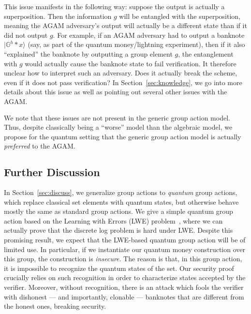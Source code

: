 \documentclass{article}\usepackage[a4paper,margin=20mm]{geometry}
\numberwithin{theorem}{section}
\numberwithin{equation}{section}
\newcommand{\G}{\mathbb{G}}
\begin{document}
This issue manifests in the following way: suppose the output is actually a superposition. Then the information $g$ will be entangled with the superposition, meaning the AGAM adversary's output will actually be a different state than if it did not output $g$. For example, if an AGAM adversary had to output a banknote $|\G^h*x\rangle$ (say, as part of the quantum money/lightning experiment), then if it also ``explained'' the banknote by outputting a group element $g$, the entanglement with $g$ would actually cause the banknote state to fail verification. It therefore unclear how to interpret such an adversary. Does it actually break the scheme, even if it does not pass verification? In Section~\ref{sec:knowledge}, we go into more details about this issue as well as pointing out several other issues with the AGAM.

We note that these issues are not present in the generic group action model. Thus, despite classically being a ``worse'' model than the algebraic model, we propose for the quantum setting that the generic group action model is actually \emph{preferred} to the AGAM.














\subsection{Further Discussion}

In Section~\ref{sec:discuss}, we generalize group actions to \emph{quantum} group actions, which replace classical set elements with quantum states, but otherwise behave mostly the same as standard group actions. We give a simple quantum group action based on the Learning with Errors (LWE) problem~\cite{DBLP:journals/jacm/Regev09}, where we can actually prove that the discrete log problem is hard under LWE. Despite this promising result, we expect that the LWE-based quantum group action will be of limited use. In particular, if we instantiate our quantum money construction over this group, the construction is \emph{insecure}. The reason is that, in this group action, it is impossible to recognize the quantum states of the set. Our security proof crucially relies on such recognition in order to characterize states accepted by the verifier. Moreover, without recognition, there is an attack which fools the verifier with dishonest --- and importantly, clonable --- banknotes that are different from the honest ones, breaking security.
\end{document}
